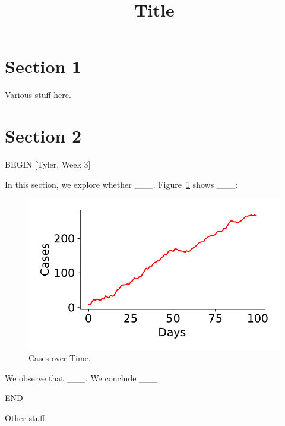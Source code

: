 \documentclass[twocolumn]{article}
\begin{document}
\title{Title}
\maketitle

\section{Section 1}

Various stuff here.

\section{Section 2}

BEGIN [Tyler, Week 3]

In this section, we explore whether \_\_\_.  Figure~\ref{fig:cases}
shows \_\_\_:

\begin{figure}
  \includegraphics[width=\columnwidth]{cases.pdf}
  \caption{Cases over Time.}
  \label{fig:cases}
\end{figure}

We observe that \_\_\_.  We conclude \_\_\_.

END

Other stuff.
\end{document}
